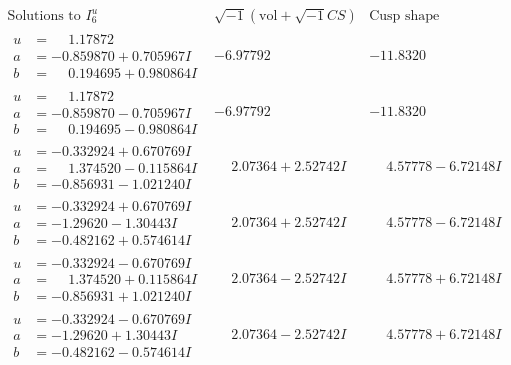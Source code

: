 \documentclass[1p]{elsarticle_modified}
\theoremstyle{definition}
\newcommand{\I}{\sqrt{-1}}
\begin{document}
$$\begin{array}{c|c|c}  
\text{Solutions to }I^u_{6}& \I (\text{vol} + \sqrt{-1}CS) & \text{Cusp shape}\\
 \hline 
\begin{aligned}
u &= \phantom{-}1.17872\phantom{ +0.000000I} \\
a &= -0.859870 + 0.705967 I \\
b &= \phantom{-}0.194695 + 0.980864 I\end{aligned}
 & -6.97792\phantom{ +0.000000I} & -11.8320\phantom{ +0.000000I} \\ \hline\begin{aligned}
u &= \phantom{-}1.17872\phantom{ +0.000000I} \\
a &= -0.859870 - 0.705967 I \\
b &= \phantom{-}0.194695 - 0.980864 I\end{aligned}
 & -6.97792\phantom{ +0.000000I} & -11.8320\phantom{ +0.000000I} \\ \hline\begin{aligned}
u &= -0.332924 + 0.670769 I \\
a &= \phantom{-}1.374520 - 0.115864 I \\
b &= -0.856931 - 1.021240 I\end{aligned}
 & \phantom{-}2.07364 + 2.52742 I & \phantom{-}4.57778 - 6.72148 I \\ \hline\begin{aligned}
u &= -0.332924 + 0.670769 I \\
a &= -1.29620 - 1.30443 I \\
b &= -0.482162 + 0.574614 I\end{aligned}
 & \phantom{-}2.07364 + 2.52742 I & \phantom{-}4.57778 - 6.72148 I \\ \hline\begin{aligned}
u &= -0.332924 - 0.670769 I \\
a &= \phantom{-}1.374520 + 0.115864 I \\
b &= -0.856931 + 1.021240 I\end{aligned}
 & \phantom{-}2.07364 - 2.52742 I & \phantom{-}4.57778 + 6.72148 I \\ \hline\begin{aligned}
u &= -0.332924 - 0.670769 I \\
a &= -1.29620 + 1.30443 I \\
b &= -0.482162 - 0.574614 I\end{aligned}
 & \phantom{-}2.07364 - 2.52742 I & \phantom{-}4.57778 + 6.72148 I \\ \hline\begin{aligned}

\end{aligned}
\end{array}$$
\end{document}
